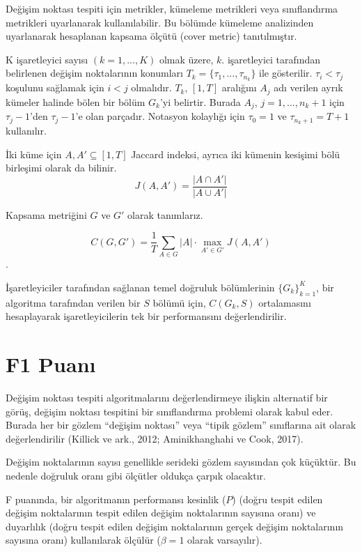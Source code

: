 \documentclass[12pt,twoside]{deuthesis}
\begin{document}
Değişim noktası tespiti için metrikler, kümeleme metrikleri veya sınıflandırma metrikleri uyarlanarak kullanılabilir. Bu bölümde kümeleme analizinden uyarlanarak hesaplanan kapsama ölçütü (cover metric) tanıtılmıştır.

K işaretleyici sayısı \((k=1,...,K)\) olmak üzere, \(k.\) işaretleyici tarafından belirlenen değişim noktalarının konumları \(T_k = \{\tau_1,...,\tau_{n_k}\}\) ile gösterilir. \(\tau_i < \tau_j\) koşulunu sağlamak için \(i < j\) olmalıdır. \(T_k\), \([1, T]\) aralığını \(A_j\) adı verilen ayrık kümeler halinde bölen bir bölüm \(G_k\)'yi belirtir. Burada \(A_j\), \(j = 1,...,n_k +1\) için \(\tau_{j} -1\)'den \(\tau_{j} -1\)'e olan parçadır. Notasyon kolaylığı için \(\tau_0 = 1\) ve \(\tau_{n_k+1} = T +1\) kullanılır.

İki küme için \(A, A' \subseteq [1, T ]\) Jaccard indeksi, ayrıca iki kümenin kesişimi bölü birleşimi olarak da bilinir. \[J(A,A')=\frac{|A\cap A'|}{|A\cup A'|}\]

Kapsama metriğini \(G\) ve \(G'\) olarak tanımlarız.

\[C(G,G') = \frac{1}{T} \sum_{A \in G} |A| \cdot \max_{A' \in G'} J(A,A')\].

İşaretleyiciler tarafından sağlanan temel doğruluk bölümlerinin \(\{G_k\}_{k=1}^K\), bir algoritma tarafından verilen bir \(S\) bölümü için, \(C(G_k,S)\) ortalamasını hesaplayarak işaretleyicilerin tek bir performansını değerlendirilir.

\hypertarget{f1-puanux131}{%
\section{F1 Puanı}\label{f1-puanux131}}

Değişim noktası tespiti algoritmalarını değerlendirmeye ilişkin alternatif bir görüş, değişim noktası tespitini bir sınıflandırma problemi olarak kabul eder. Burada her bir gözlem ``değişim noktası'' veya ``tipik gözlem'' sınıflarına ait olarak değerlendirilir (Killick ve ark., 2012; Aminikhanghahi ve Cook, 2017).

Değişim noktalarının sayısı genellikle serideki gözlem sayısından çok küçüktür. Bu nedenle doğruluk oranı gibi ölçütler oldukça çarpık olacaktır.

F puanında, bir algoritmanın performansı kesinlik (\(P\)) (doğru tespit edilen değişim noktalarının tespit edilen değişim noktalarının sayısına oranı) ve duyarlılık (doğru tespit edilen değişim noktalarının gerçek değişim noktalarının sayısına oranı) kullanılarak ölçülür (\(\beta = 1\) olarak varsayılır).
\end{document}
